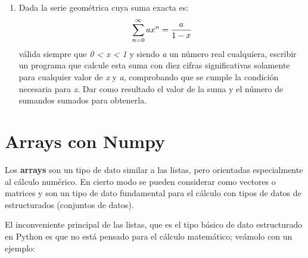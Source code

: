 \documentclass[letterpaper,10pt,spanish]{sphinxmanual}
\begin{document}
\begin{enumerate}
\begin{tabulary}{\linewidth}{|L|L|}
\hline

\emph{c}
 & 
8.2  0.0   9.0   5.0   8.4  7.2  5.0  9.2  4.9  7.9
\\

\emph{z}
 & 
7.1  5.1   8.8   3.1   4.6  2.0  4.1  7.4  4.4  8.8
\\
\hline
\end{tabulary}


Hacer un programa que calcule sus notas finales indicando además quién ha aprobado y suspendido. Calcular también la nota media de la evaluación contínua, del examen final y de la nota final. En todos los resultados debe mostrarse una única cifra decimal.

\item {} 
Dada la serie geométrica cuya suma exacta es:
\begin{gather}
\begin{split}\sum_{n=0}^{\infty} ax^n =  \frac{a}{1 - x}\end{split}\notag
\end{gather}
válida siempre que \emph{0 \textless{} x \textless{} 1} y siendo \emph{a} un número real cualquiera, escribir un programa que calcule esta suma con diez cifras significativas solamente para cualquier valor de \emph{x} y \emph{a}, comprobando que se cumple la condición necesaria para \emph{x}. Dar como resultado el valor de la suma y el número de sumandos sumados para obtenerla.

\end{enumerate}


\chapter{Arrays con Numpy}
\label{numpy::doc}\label{numpy:arrays-con-numpy}
Los \textbf{arrays} son un tipo de dato similar a las listas, pero orientadas especialmente al cálculo numérico. En cierto modo se pueden considerar como vectores o matrices y son un tipo de dato fundamental para el cálculo con tipos de datos de estructurados (conjuntos de datos).

El inconveniente principal de las listas, que es el tipo básico de dato estructurado en Python es que no está pensado para el cálculo matemático; veámolo con un ejemplo:
\end{document}
